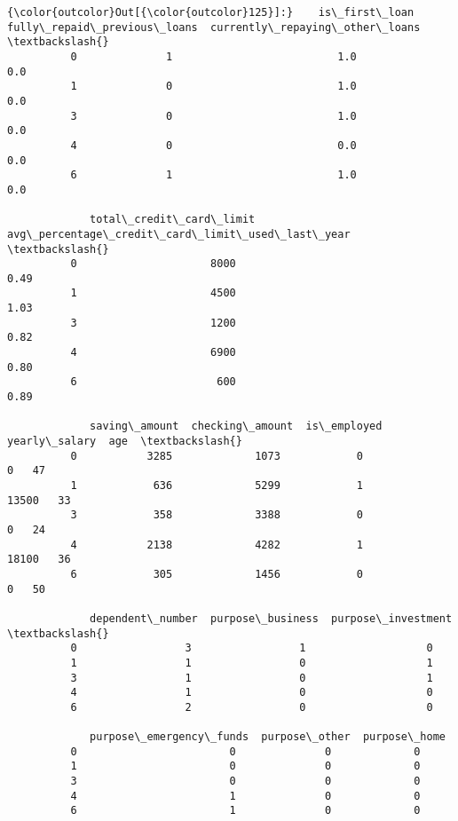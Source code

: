 \documentclass{report}
\begin{document}
            \begin{Verbatim}[commandchars=\\\{\}]
{\color{outcolor}Out[{\color{outcolor}125}]:}    is\_first\_loan  fully\_repaid\_previous\_loans  currently\_repaying\_other\_loans  \textbackslash{}
          0              1                          1.0                             0.0   
          1              0                          1.0                             0.0   
          3              0                          1.0                             0.0   
          4              0                          0.0                             0.0   
          6              1                          1.0                             0.0   
          
             total\_credit\_card\_limit  avg\_percentage\_credit\_card\_limit\_used\_last\_year  \textbackslash{}
          0                     8000                                             0.49   
          1                     4500                                             1.03   
          3                     1200                                             0.82   
          4                     6900                                             0.80   
          6                      600                                             0.89   
          
             saving\_amount  checking\_amount  is\_employed  yearly\_salary  age  \textbackslash{}
          0           3285             1073            0              0   47   
          1            636             5299            1          13500   33   
          3            358             3388            0              0   24   
          4           2138             4282            1          18100   36   
          6            305             1456            0              0   50   
          
             dependent\_number  purpose\_business  purpose\_investment  \textbackslash{}
          0                 3                 1                   0   
          1                 1                 0                   1   
          3                 1                 0                   1   
          4                 1                 0                   0   
          6                 2                 0                   0   
          
             purpose\_emergency\_funds  purpose\_other  purpose\_home  
          0                        0              0             0  
          1                        0              0             0  
          3                        0              0             0  
          4                        1              0             0  
          6                        1              0             0  
\end{Verbatim}
        
\end{document}
